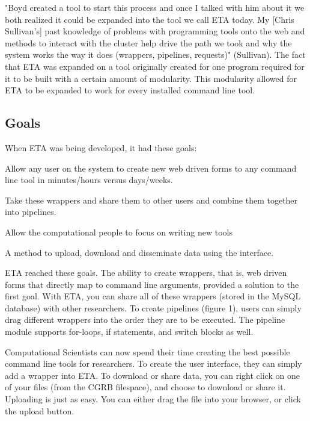 \documentclass[a4paper,12pt]{article}
\begin{document}
 "Boyd created a tool to start this process and once I talked with him about it we both realized it could be expanded into the tool we call ETA today. My [Chris Sullivan's] past knowledge of problems with programming tools onto the web and methods to interact with the cluster help drive the path we took and why the system works the way it does (wrappers, pipelines, requests)" (Sullivan). The fact that ETA was expanded on a tool originally created for one program required for it to be built with a certain amount of modularity. This modularity allowed for ETA to be expanded to work for every installed command line tool.
 
 \subsection{Goals}
When ETA was being developed, it had these goals:
 \begin{compactenum}
    \item Allow any user on the system to create new web driven forms to any command line tool in minutes/hours versus days/weeks.
    \item Take these wrappers and share them to other users and combine them together into pipelines.
 	\item Allow the computational people to focus on writing new tools
 	\item A method to upload, download and disseminate data using the interface.
 \end{compactenum}

 ETA reached these goals. The ability to create wrappers, that is, web driven forms that directly map to command line arguments, provided a solution to the first goal. With ETA, you can share all of these wrappers (stored in the MySQL database) with other researchers. To create pipelines (figure 1), users can simply drag different wrappers into the order they are to be executed. The pipeline module supports for-loops, if statements, and switch blocks as well. 
 
 Computational Scientists can now spend their time creating the best possible command line tools for researchers. To create the user interface, they can simply add a wrapper into ETA. To download or share data, you can right click on one of your files (from the CGRB filespace), and choose to download or share it. Uploading is just as easy. You can either drag the file into your browser, or click the upload button.
 
\end{document}
